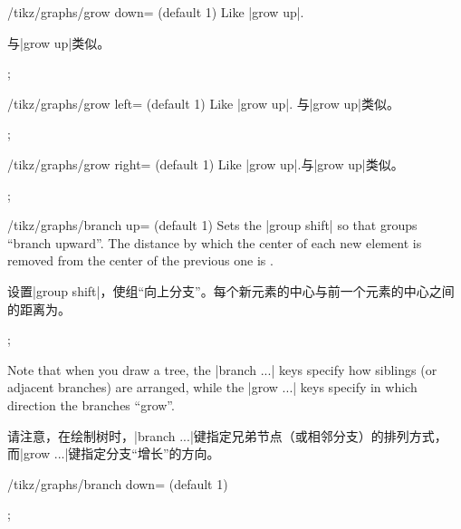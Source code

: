 \begin{key}{/tikz/graphs/grow down= (default 1)}
    Like |grow up|.
    
    与|grow up|类似。
%
\begin{codeexample}[preamble={\usetikzlibrary{graphs}}]
\tikz {};
\end{codeexample}
\end{key}

\begin{key}{/tikz/graphs/grow left= (default 1)}
    Like |grow up|. 与|grow up|类似。

\begin{codeexample}[preamble={\usetikzlibrary{graphs}}]
\tikz {};
\end{codeexample}
\end{key}

\begin{key}{/tikz/graphs/grow right= (default 1)}
    Like |grow up|.与|grow up|类似。

\begin{codeexample}[preamble={\usetikzlibrary{graphs}}]
\tikz {};
\end{codeexample}
\end{key}

\begin{key}{/tikz/graphs/branch up= (default 1)}
    Sets the |group shift| so that groups ``branch upward''.  The distance by
    which the center of each new element is removed from the center of the
    previous one is .
    
    设置|group shift|，使组“向上分支”。每个新元素的中心与前一个元素的中心之间的距离为。
%
\begin{codeexample}[preamble={\usetikzlibrary{graphs}}]
\tikz {};
\end{codeexample}
    Note that when you draw a tree, the |branch ...| keys specify how siblings
    (or adjacent branches) are arranged, while the |grow ...| keys specify in
    which direction the branches ``grow''.

    请注意，在绘制树时，|branch ...|键指定兄弟节点（或相邻分支）的排列方式，而|grow ...|键指定分支“增长”的方向。
  \end{key}

\begin{key}{/tikz/graphs/branch down= (default 1)}
%
\begin{codeexample}[preamble={\usetikzlibrary{graphs}}]
\tikz {};
\end{codeexample}
%
\end{key}

